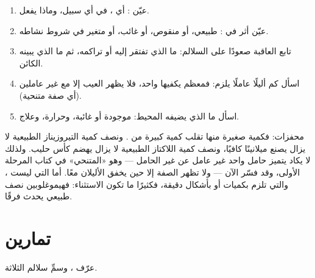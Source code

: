 \begin{method}\label{met:g11:enzymes-and-phenotype:reason}
\begin{enumerate}
  \item عيّن : أي ، في أي سبيل، وماذا يفعل.
  \item عيّن أثر  في : طبيعي، أو منقوص، أو غائب، أو
        متغير في شروط نشاطه.
  \item تابع العاقبة صعودًا على السلالم: ما الذي تفتقر إليه  أو
        تراكمه، ثم ما الذي يبينه الكائن.
  \item اسأل كم أليلًا عاملًا يلزم: فمعظم  يكفيها واحد، فلا
        يظهر العيب إلا مع  غير عاملين (أي صفة متنحية).
  \item اسأل ما الذي يضيفه المحيط:  موجودة أو غائبة، وحرارة،
        وعلاج.
\end{enumerate}
\end{method}

\begin{remark}\label{rem:g11:enzymes-and-phenotype:recessive}
 محفزات: فكمية صغيرة منها تقلب كمية كبيرة من . ونصف
كمية التيروزيناز الطبيعية لا يزال يصنع ميلانينًا كافيًا، ونصف كمية
اللاكتاز الطبيعية لا يزال يهضم كأس حليب. ولذلك لا يكاد يتميز حامل
 واحد غير عامل عن غير الحامل --- وهو «المتنحي» في كتاب المرحلة
الأولى، وقد فسّر الآن --- ولا تظهر الصفة إلا حين يخفق الأليلان معًا.
أما  التي ليست ، والتي تلزم بكميات أو بأشكال دقيقة،
فكثيرًا ما تكون الاستثناء: فهيموغلوبين نصف طبيعي يحدث فرقًا.
\end{remark}

\section{تمارين}

\begin{exercise}[$\star$]\label{exo:g11:enzymes-and-phenotype:1}
عرّف  ، وسمِّ سلالم  الثلاثة.
\end{exercise}

